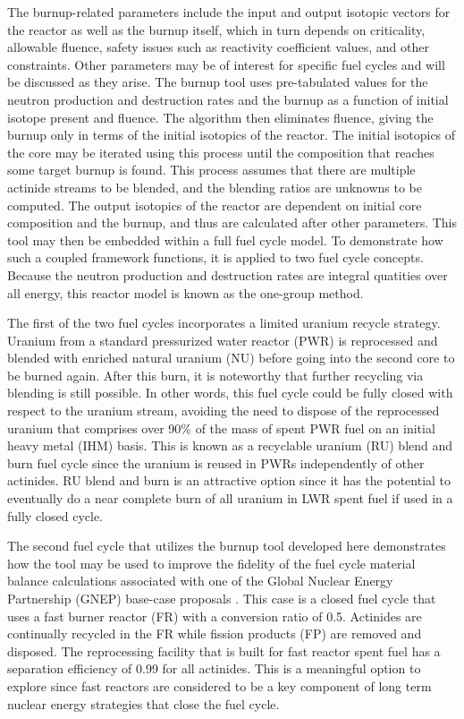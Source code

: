 The burnup-related parameters include the input and output isotopic vectors for the reactor 
as well as the burnup itself, which in turn depends on criticality, allowable fluence, safety issues 
such as reactivity coefficient values, and other constraints.  Other parameters may be of interest 
for specific fuel cycles and will be discussed as they arise.  The burnup tool uses pre-tabulated 
values for the neutron production and destruction rates and the burnup as a function of initial 
isotope present and fluence.  The algorithm then eliminates fluence, giving the burnup only in 
terms of the initial isotopics of the reactor.  The initial isotopics of the core may be iterated 
using this process until the composition that reaches some target burnup is found.  This process 
assumes that there are multiple actinide streams to be blended, and the blending ratios are unknowns 
to be computed.  The output isotopics of the reactor are dependent on initial core composition and 
the burnup, and thus are calculated after other parameters.   This tool may then be embedded within 
a full fuel cycle model.  To demonstrate how such a coupled framework functions, it is applied to 
two fuel cycle concepts.  Because the neutron production and destruction rates are integral 
quatities over all energy, this reactor model is known as the one-group method.

The first of the two fuel cycles incorporates a limited uranium recycle strategy.   Uranium from a 
standard pressurized water reactor (PWR) is reprocessed and blended with enriched natural uranium 
(NU) before going into the second core to be burned again.  After this burn, it is noteworthy that 
further recycling via blending is still possible.  In other words, this fuel cycle could be fully 
closed with respect to the uranium stream, avoiding the need to dispose of the reprocessed uranium 
that comprises over 90\% of the mass of spent PWR fuel on an initial heavy metal (IHM) basis.  
This is known as a recyclable uranium (RU) blend and burn fuel cycle since the uranium is reused 
in PWRs independently of other actinides.  RU blend and burn is an attractive option since it has 
the potential to eventually do a near complete burn of all uranium in LWR spent fuel if used in a 
fully closed cycle.

The second fuel cycle that utilizes the burnup tool developed here demonstrates how the tool may 
be used to improve the fidelity of the fuel cycle material balance calculations associated with 
one of the Global Nuclear Energy Partnership (GNEP) base-case proposals \cite{PC-000555}.  This case is a 
closed fuel cycle that uses a fast burner reactor (FR) with a conversion ratio of 0.5.  
Actinides are continually recycled in the FR while fission products (FP) are removed and 
disposed.  The reprocessing facility that is built for fast reactor spent fuel has a separation 
efficiency of 0.99 for all actinides.  This is a meaningful option to explore since fast reactors 
are considered to be a key component of long term nuclear energy strategies that close the fuel cycle.


